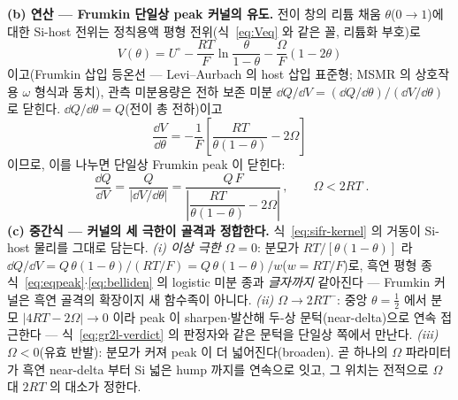 \textbf{(b) 연산 --- Frumkin 단일상 peak 커널의 유도.} 전이 창의 리튬 채움 $\theta$($0\!\to\!1$)에 대한 Si-host
전위는 정칙용액 평형 전위(식~\eqref{eq:Veq} 와 같은 꼴, 리튬화 부호)로
\begin{equation}
V(\theta)=U^{\circ}-\frac{RT}{F}\ln\frac{\theta}{1-\theta}-\frac{\Omega}{F}(1-2\theta)
\label{eq:sifr-V}
\end{equation}
이고(Frumkin 삽입 등온선 --- Levi--Aurbach\cite{leviaurbach1999} 의 host 삽입 표준형; MSMR 의 상호작용 $\omega$
형식과 동치\cite{msmr_origin2017}), 관측 미분용량은 전하 보존 미분 $\dd Q/\dd V=(\dd Q/\dd\theta)/(\dd V/\dd\theta)$
로 닫힌다. $\dd Q/\dd\theta=Q$(전이 총 전하)이고
\begin{equation}
\frac{\dd V}{\dd\theta}=-\frac{1}{F}\left[\frac{RT}{\theta(1-\theta)}-2\Omega\right]
\label{eq:sifr-dVdtheta}
\end{equation}
이므로, 이를 나누면 단일상 Frumkin peak 이 닫힌다:
\begin{equation}
\boxed{\;
\frac{\dd Q}{\dd V}=\frac{Q}{\bigl|\dd V/\dd\theta\bigr|}
=\frac{Q\,F}{\left|\dfrac{RT}{\theta(1-\theta)}-2\Omega\right|}\,,\qquad \Omega<2RT\;.}
\label{eq:sifr-kernel}
\end{equation}
\textbf{(c) 중간식 --- 커널의 세 극한이 골격과 정합한다.} 식~\eqref{eq:sifr-kernel} 의 거동이 Si-host 물리를
그대로 담는다. \emph{(i) 이상 극한 $\Omega=0$}: 분모가 $RT/[\theta(1-\theta)]$ 라
$\dd Q/\dd V=Q\,\theta(1-\theta)/(RT/F)=Q\,\theta(1-\theta)/w$($w=RT/F$)로, 흑연 평형 종
식~\eqref{eq:eqpeak}$\cdot$\eqref{eq:belliden} 의 logistic 미분 종과 \emph{글자까지} 같아진다 --- Frumkin 커널은
흑연 골격의 확장이지 새 함수족이 아니다. \emph{(ii) $\Omega\to2RT^-$}: 중앙 $\theta=\tfrac12$ 에서 분모
$|4RT-2\Omega|\to0$ 이라 peak 이 sharpen$\cdot$발산해 두-상 문턱(near-delta)으로 연속 접근한다 ---
식~\eqref{eq:gr2l-verdict} 의 판정자와 같은 문턱을 단일상 쪽에서 만난다. \emph{(iii) $\Omega<0$}(유효 반발): 분모가
커져 peak 이 더 넓어진다(broaden). 곧 하나의 $\Omega$ 파라미터가 흑연 near-delta 부터 Si 넓은 hump 까지를
연속으로 잇고, 그 위치는 전적으로 $\Omega$ 대 $2RT$ 의 대소가 정한다.

